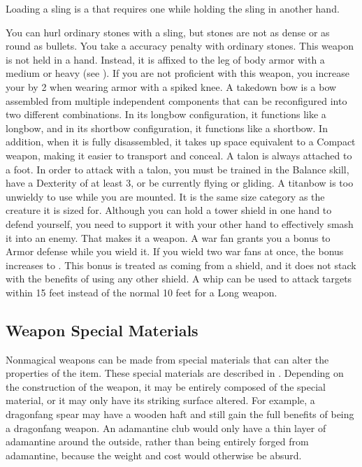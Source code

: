      Loading a sling is a  that requires one  while holding the sling in another hand.
    \par You can hurl ordinary stones with a sling, but stones are not as dense or as round as bullets. You take a  accuracy penalty with ordinary stones.
     This weapon is not held in a hand.
    Instead, it is affixed to the leg of body armor with a medium or heavy  (see ).
    If you are not proficient with this weapon, you increase your  by 2 when wearing armor with a spiked knee.
     A takedown bow is a bow assembled from multiple independent components that can be reconfigured into two different combinations.
    In its longbow configuration, it functions like a longbow, and in its shortbow configuration, it functions like a shortbow.
    In addition, when it is fully disassembled, it takes up space equivalent to a Compact weapon, making it easier to transport and conceal.
     A talon is always attached to a foot.
    In order to attack with a talon, you must be trained in the Balance skill, have a Dexterity of at least 3, or be currently flying or gliding.
     A titanbow is too unwieldy to use while you are mounted.
    It is the same size category as the creature it is sized for.
     Although you can hold a tower shield in one hand to defend yourself, you need to support it with your other hand to effectively smash it into an enemy.
    That makes it a  weapon.
     A war fan grants you a  bonus to Armor defense while you wield it.
    If you wield two war fans at once, the bonus increases to .
    This bonus is treated as coming from a shield, and it does not stack with the benefits of using any other shield.
     A whip can be used to attack targets within 15 feet instead of the normal 10 feet for a Long weapon.

  \subsection{Weapon Special Materials}\label{Weapon Special Materials}
    Nonmagical weapons can be made from special materials that can alter the properties of the item.
    These special materials are described in .
    Depending on the construction of the weapon, it may be entirely composed of the special material, or it may only have its striking surface altered.
    For example, a dragonfang spear may have a wooden haft and still gain the full benefits of being a dragonfang weapon.
    An adamantine club would only have a thin layer of adamantine around the outside, rather than being entirely forged from adamantine, because the weight and cost would otherwise be absurd.

